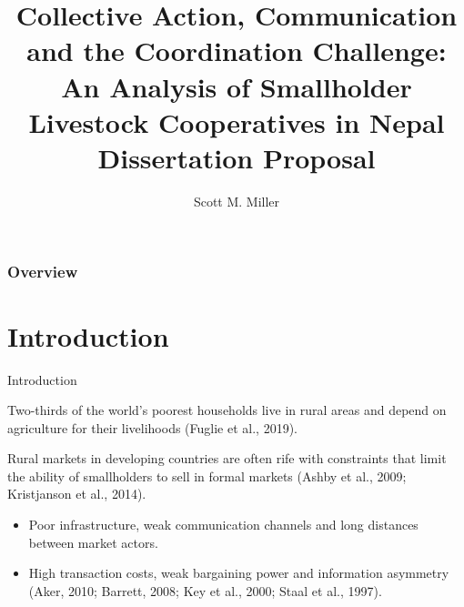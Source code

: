 \documentclass[aspectratio=169]{beamer}
\title[Short title]{Collective Action, Communication and the Coordination Challenge:
An Analysis of Smallholder Livestock Cooperatives in Nepal \\
{\small Dissertation Proposal}} %
\author{Scott M. Miller} %
\institute[Food and Resource Economics Department, University of Florida] %
{
Food and Resource Economics Department \\ University of Florida\\ %
\medskip
}
\newenvironment{wideitemize}{\itemize\addtolength{\itemsep}{10pt}}{\enditemize}
\begin{document}
\begin{frame}
\titlepage %
\end{frame}

\begin{frame}
\frametitle{Overview} %
\tableofcontents %
\end{frame}



\section{Introduction}

\begin{frame}{Introduction}
    \begin{wideitemize}
        \item Two-thirds of the world’s poorest households live in rural areas and depend on agriculture for their livelihoods (Fuglie et al., 2019). 
        \item Rural markets in developing countries are often rife with constraints that limit the ability of smallholders to sell in formal markets (Ashby et al., 2009; Kristjanson et al., 2014). \vspace{.25cm}
            \begin{itemize}
                \item Poor infrastructure, weak communication channels and long distances between market actors. \vspace{.25cm}
                \item High transaction costs, weak bargaining power and information asymmetry (Aker, 2010; Barrett, 2008; Key et al., 2000; Staal et al., 1997).
            \end{itemize}
    \end{wideitemize}
\end{frame}
\end{document}
